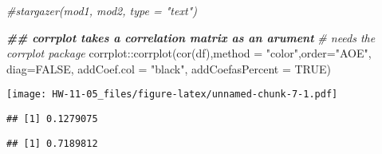 \documentclass[
]{article}
\newenvironment{Shaded}{\begin{snugshade}}{\end{snugshade}}
\newcommand{\AttributeTok}[1]{\textcolor[rgb]{0.77,0.63,0.00}{#1}}
\newcommand{\CommentTok}[1]{\textcolor[rgb]{0.56,0.35,0.01}{\textit{#1}}}
\newcommand{\ConstantTok}[1]{\textcolor[rgb]{0.00,0.00,0.00}{#1}}
\newcommand{\DocumentationTok}[1]{\textcolor[rgb]{0.56,0.35,0.01}{\textbf{\textit{#1}}}}
\newcommand{\FunctionTok}[1]{\textcolor[rgb]{0.00,0.00,0.00}{#1}}
\newcommand{\NormalTok}[1]{#1}
\newcommand{\SpecialCharTok}[1]{\textcolor[rgb]{0.00,0.00,0.00}{#1}}
\newcommand{\StringTok}[1]{\textcolor[rgb]{0.31,0.60,0.02}{#1}}
\begin{document}
\begin{Shaded}
\begin{Highlighting}[]
\CommentTok{\#stargazer(mod1, mod2, type = "text")}
\end{Highlighting}
\end{Shaded}

\begin{Shaded}
\begin{Highlighting}[]
\DocumentationTok{\#\# corrplot takes a correlation matrix as an arument}
  \CommentTok{\# needs the corrplot package}
\NormalTok{corrplot}\SpecialCharTok{::}\FunctionTok{corrplot}\NormalTok{(}\FunctionTok{cor}\NormalTok{(df),}\AttributeTok{method =} \StringTok{"color"}\NormalTok{,}\AttributeTok{order=}\StringTok{"AOE"}\NormalTok{, }
                   \AttributeTok{diag=}\ConstantTok{FALSE}\NormalTok{, }\AttributeTok{addCoef.col =} \StringTok{"black"}\NormalTok{, }\AttributeTok{addCoefasPercent =} \ConstantTok{TRUE}\NormalTok{)}
\end{Highlighting}
\end{Shaded}

\texttt{[image: HW-11-05\_files/figure-latex/unnamed-chunk-7-1.pdf]}

\begin{Shaded}
\end{Shaded}

\begin{verbatim}
## [1] 0.1279075
\end{verbatim}

\begin{Shaded}
\end{Shaded}

\begin{verbatim}
## [1] 0.7189812
\end{verbatim}

\begin{Shaded}
\end{Shaded}
\end{document}
